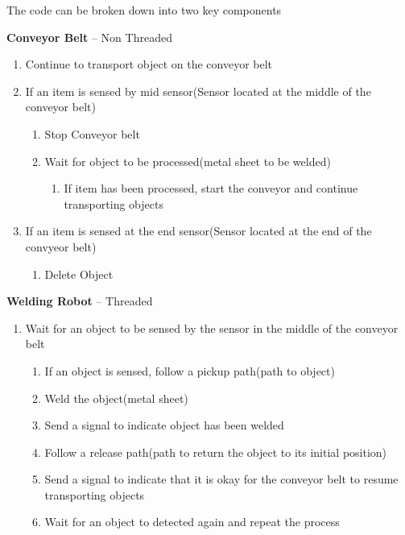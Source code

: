 \documentclass[12pt]{article}
\begin{document}
  The code can be broken down into two key components 

  \textbf{Conveyor Belt}  -- Non Threaded
    \begin{enumerate}
        \item Continue to transport object on the conveyor belt
        \item If an item is sensed by mid sensor(Sensor located at the middle of the conveyor belt)
          \begin{enumerate}
             \item Stop Conveyor belt
             \item Wait for object to be processed(metal sheet to be welded)
             \begin{enumerate}
               \item If item has been processed, start the conveyor and continue transporting objects
             \end{enumerate}
          \end{enumerate}
        \item If an item is sensed at the end sensor(Sensor located at the end of the convyeor belt)
          \begin{enumerate}
            \item Delete Object
          \end{enumerate}
    \end{enumerate}

  \textbf{Welding Robot} --  Threaded
    \begin{enumerate} 
        \item Wait for an object to be sensed by the sensor in the middle of the conveyor belt 
          \begin{enumerate}
            \item If an object is sensed, follow a pickup path(path to object) 
            \item Weld the object(metal sheet)
            \item Send a signal to indicate object has been welded
            \item Follow a release path(path to return the object to its initial position) 
            \item Send a signal to indicate that it is okay for the conveyor belt to resume  transporting objects
            \item Wait for an object to detected again and repeat the process
          \end{enumerate}
    \end{enumerate}
\end{document}
